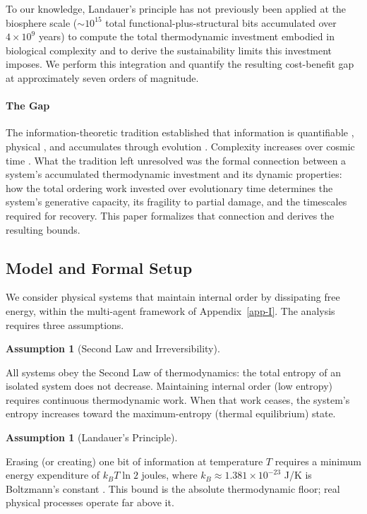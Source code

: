 \documentclass[11pt]{article}
\theoremstyle{plain}
\theoremstyle{definition}
\newtheorem{assumption}[definition]{Assumption}
\theoremstyle{remark}
\let\origsubsection\subsection
\renewcommand{\subsection}{\needspace{7\baselineskip}\origsubsection}
\let\origparagraphcmd\paragraph
\renewcommand{\paragraph}{\needspace{3\baselineskip}\origparagraphcmd}
\begin{document}
To our knowledge, Landauer's principle has not previously been applied
at the biosphere scale (\(\sim 10^{15}\) total
functional-plus-structural bits accumulated over \(4 \times 10^9\)
years) to compute the total thermodynamic investment embodied in
biological complexity and to derive the sustainability limits this
investment imposes. We perform this integration and quantify the
resulting cost-benefit gap at approximately seven orders of magnitude.

\paragraph{The Gap}\label{the-gap}

The information-theoretic tradition established that information is
quantifiable \citep{Shannon1948}, physical
\citep{Brillouin1962, Landauer1961}, and accumulates through evolution
\citep{Adami2004}. Complexity increases over cosmic time
\citep{Chaisson2011}. What the tradition left unresolved was the formal
connection between a system's accumulated thermodynamic investment and
its dynamic properties: how the total ordering work invested over
evolutionary time determines the system's generative capacity, its
fragility to partial damage, and the timescales required for recovery.
This paper formalizes that connection and derives the resulting bounds.

\subsection{Model and Formal Setup}\label{model-and-formal-setup}

We consider physical systems that maintain internal order by dissipating
free energy, within the multi-agent framework of Appendix~\ref{app-I}.
The analysis requires three assumptions.

\begin{assumption}[Second Law and Irreversibility]
\label{asm-second-law}

All systems obey the Second Law of thermodynamics: the total entropy of an isolated system does not decrease. Maintaining internal order (low entropy) requires continuous thermodynamic work. When that work ceases, the system's entropy increases toward the maximum-entropy (thermal equilibrium) state.
\end{assumption}

\begin{assumption}[Landauer's Principle]
\label{asm-landauer-principle}

Erasing (or creating) one bit of information at temperature $T$ requires a minimum energy expenditure of $k_B T \ln 2$ joules, where $k_B \approx 1.381 \times 10^{-23}$ J/K is Boltzmann's constant \citep{Landauer1961}. This bound is the absolute thermodynamic floor; real physical processes operate far above it.
\end{assumption}
\end{document}
